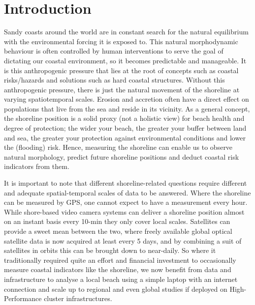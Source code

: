 \documentclass[remotesensing,article,submit,pdftex,moreauthors]{Definitions/mdpi}
\begin{document}
\section{Introduction}
Sandy coasts around the world are in constant search for the natural equilibrium with the environmental forcing it is exposed to. This natural morphodynamic behaviour is often controlled by human interventions to serve the goal of dictating our coastal environment, so it becomes predictable and manageable. It is this anthropogenic pressure that lies at the root of concepts such as coastal risks/hazards and solutions such as hard coastal structures. Without this anthropogenic pressure, there is just the natural movement of the shoreline at varying spatiotemporal scales. Erosion and accretion often have a direct effect on populations that live from the sea and reside in its vicinity. As a general concept, the shoreline position is a solid proxy (not a holistic view) for beach health and degree of protection; the wider your beach, the greater your buffer between land and sea, the greater your protection against environmental conditions and lower the (flooding) risk. Hence, measuring the shoreline can enable us to observe natural morphology, predict future shoreline positions and deduct coastal risk indicators from them.

It is important to note that different shoreline-related questions require different and adequate spatial-temporal scales of data to be answered. Where the shoreline can be measured by GPS, one cannot expect to have a measurement every hour. While shore-based video camera systems can deliver a shoreline position almost on an instant basis every 10-min they only cover local scales. Satellites can provide a sweet mean between the two, where freely available global optical satellite data is now acquired at least every 5 days, and by combining a suit of satellites in orbits this can be brought down to near-daily. So where it traditionally required quite an effort and financial investment to occasionally measure coastal indicators like the shoreline, we now benefit from data and infrastructure to analyse a local beach using a simple laptop with an internet connection and scale up to regional and even global studies if deployed on High-Performance cluster infrastructures. 
\end{document}
